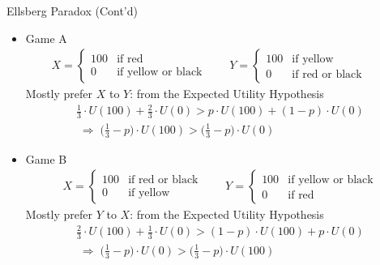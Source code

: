 \documentclass[10pt,handout]{beamer}
\newcommand{\ie}{\;\Longrightarrow\;}
\begin{document}
\begin{frame}{Ellsberg Paradox (Cont'd)}
  \begin{itemize}[<+->]\setlength\itemsep{0em}
    \item Game A  
      \begin{align*}
        X = \begin{cases}100 & \text{if red}\\0 & \text{if yellow or black}\end{cases} \qquad
        Y = \begin{cases}100 & \text{if yellow}\\0 & \text{if red or black}\end{cases} \qquad
      \end{align*}
      \onslide<+->
      Mostly prefer $X$ to $Y$: from the Expected Utility Hypothesis 
      \onslide<+->
      \begin{multline}
        \frac{1}{3}\cdot U(100) + \frac{2}{3}\cdot U(0) > p\cdot U(100) + (1 - p)\cdot U(0) \\ \ie\big(\frac{1}{3} - p\big)\cdot U(100) > \big(\frac{1}{3} - p\big)\cdot U(0)
      \end{multline}
    \item Game B 
      \begin{align*}
        X = \begin{cases}100 & \text{if red or black}\\ 0 & \text{if yellow}\end{cases} \qquad
        Y = \begin{cases}100 & \text{if yellow or black}\\ 0 & \text{if red}\end{cases}
      \end{align*}
      \onslide<+->
      Mostly prefer $Y$ to $X$: from the Expected Utility Hypothesis 
      \onslide<+->
      \begin{multline}
        \frac{2}{3}\cdot U(100) + \frac{1}{3}\cdot U(0) > (1 - p)\cdot U(100) + p\cdot U(0) \\ \ie\big(\frac{1}{3} - p\big)\cdot U(0) > \big(\frac{1}{3} - p\big)\cdot U(100)
      \end{multline}
  \end{itemize}
\end{frame}
\end{document}
